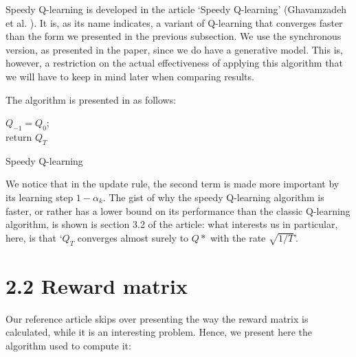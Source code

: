 \documentclass[a4paper, 12pt]{report}
\begin{document}
Speedy Q-learning is developed in the article `Speedy Q-learning' (Ghavamzadeh et al. \cite{ghavamzadeh2011speedy}).
It is, as its name indicates, a variant of Q-learning that converges faster than the form we presented in the previous subsection.
We use the synchronous version, as presented in the paper, since we do have a generative model.
This is, however, a restriction on the actual effectiveness of applying this algorithm that we will have to keep in mind later when comparing results.

The algorithm is presented in \cite{ghavamzadeh2011speedy} as follows:

\begin{algorithm}[H]
  $Q_{-1} = Q_0$;\\
  return $Q_T$
\caption{Speedy Q-learning}
\end{algorithm}

We notice that in the update rule, the second term is made more important by its learning step $1 - \alpha_k$.
The gist of why the speedy Q-learning algorithm is faster, or rather has a lower bound on its performance than the classic
Q-learning algorithm, is shown is section 3.2 of the article:
what interests us in particular, here, is that `$Q_T$ converges almost surely to $Q*$ with the rate $\sqrt{1/T}$'.

\section*{2.2 Reward matrix}

Our reference article skips over presenting the way the reward matrix is calculated,
while it is an interesting problem.
Hence, we present here the algorithm used to compute it:
\end{document}
